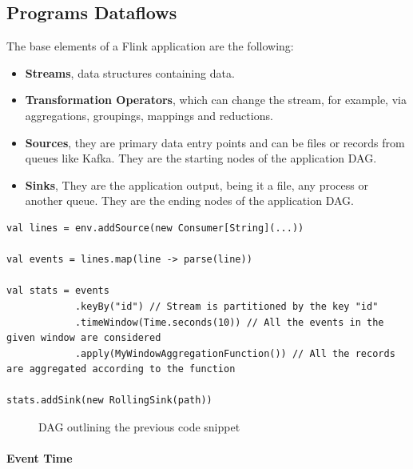 \subsection{Programs Dataflows}  \label{ProgramsDataflows}

The base elements of a Flink application are the following:

\begin{itemize}
	\item \textbf{Streams}, data structures containing data.
	\item \textbf{Transformation Operators}, which can change the stream, for example, via aggregations, groupings, mappings and reductions.
	\item \textbf{Sources}, they are primary data entry points and can be files or records from queues like Kafka. They are the starting nodes of the application DAG.
    \item \textbf{Sinks}, They are the application output, being it a file, any process or another queue. They are the ending nodes of the application DAG.
\end{itemize}

\begin{code}

\begin{verbatim}
val lines = env.addSource(new Consumer[String](...))

val events = lines.map(line -> parse(line))

val stats = events
            .keyBy("id") // Stream is partitioned by the key "id" 
            .timeWindow(Time.seconds(10)) // All the events in the given window are considered 
            .apply(MyWindowAggregationFunction()) // All the records are aggregated according to the function      

stats.addSink(new RollingSink(path))
\end{verbatim}

\end{code}

\begin{figure}[h]
	\centering
	\def\svgwidth{\columnwidth}
	
	\decoRule
	\caption[Streaming Dataflow]{DAG outlining the previous code snippet}
	\label{fig:Dataflow}
\end{figure}

\paragraph{Event Time}

